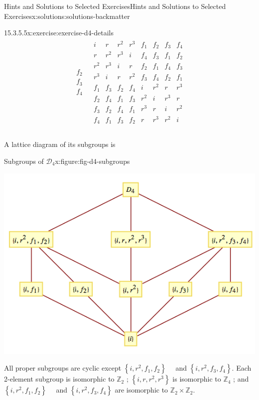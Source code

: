 \documentclass[twoside,10pt,]{book}
\numberwithin{equation}{section}
\begin{document}
\begin{solutions-chapter}{Hints and Solutions to Selected Exercises}{}{Hints and Solutions to Selected Exercises}{}{}{x:solutions:solutions-backmatter}
\begin{divisionsolution}{15.3.5.5}{}{x:exercise:exercise-d4-details}
\begin{equation*}
\begin{array}{c|c}
\begin{array}{c}
f_2 \\
f_3 \\
f_4 \\
\end{array}
& 
\begin{array}{cccccccc}
i & r & r^2 & r^3 & f_1 & f_2 & f_3 & f_4 \\
r & r^2 & r^3 & i & f_4 & f_3 & f_1 & f_2 \\
r^2 & r^3 & i & r & f_2 & f_1 & f_4 & f_3 \\
r^3 & i & r & r^2 & f_3 & f_4 & f_2 & f_1 \\
f_1 & f_3 & f_2 & f_4 & i & r^2 & r  & r^3 \\
f_2 & f_4 & f_1 & f_3 & r^2 & i & r^3 & r \\
f_3 & f_2 & f_4 & f_1 & r^3 & r & i & r^2 \\
f_4 & f_1 & f_3 & f_2 & r & r^3 & r^2 & i \\
\end{array}
\\
\end{array}
\end{equation*}
%
\par
A lattice diagram of its subgroups is%
\begin{figureptx}{Subgroups of \(\mathcal{D}_4\)}{x:figure:fig-d4-subgroups}{}%
\begin{image}{0.1}{0.8}{0.1}%
\includegraphics[width=\linewidth]{images/fig-d4-subgroups.png}
\end{image}%
\tcblower
\end{figureptx}%
All proper subgroups are cyclic except \(\left\{i,r^2,f_1,f_2\right\}\)\(\textrm{ }\textrm{ }\)and \(\left\{i,r^2,f_3,f_4\right\}\).  Each 2-element subgroup is isomorphic to \(\mathbb{Z}_2\) ; \(\left\{i,r,r^2,r^3\right\}\) is isomorphic to \(\mathbb{Z}_4\) ; and \(\left\{i,r^2,f_1,f_2\right\}\)\(\textrm{ }\textrm{ }\)and \(\left\{i,r^2,f_3,f_4\right\}\) are isomorphic to \(\mathbb{Z}_2\times \mathbb{Z}_2\).%

\end{divisionsolution}
\end{solutions-chapter}
\end{document}

